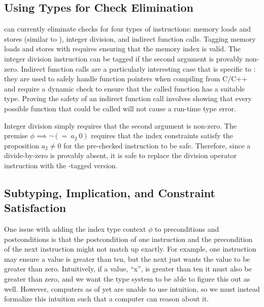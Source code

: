 \subsection{Using Types for Check Elimination}
\name can currently eliminate checks for four types of instructions: memory loads and stores (similar to \dtal), integer division, and indirect function calls.
Tagging memory loads and stores with \prechk requires ensuring that the memory index is valid.
The integer division instruction can be \prechk tagged if the second argument is provably non-zero.
Indirect function calls are a particularly interesting case that is specific to \wasm: they are used to safely handle function pointers when compiling from C/C++ and require a dynamic check to ensure that the called function has a suitable type.
Proving the safety of an indirect function call involves showing that every possible function that could be called will not cause a run-time type error.


Integer division simply requires that the second argument is non-zero.
The premise $\phi \implies \neg(=\ a_2\ 0)$ requires that the index constraints satisfy the proposition $a_2 \neq 0$ for the pre-checked instruction to be safe.
Therefore, since a divide-by-zero is provably absent, it is safe to replace the division operator instruction with the \prechk-tagged version.
\begin{mathpar}
\end{mathpar}

\subsection{Subtyping, Implication, and Constraint Satisfaction}
One issue with adding the index type context $\phi$ to preconditions and postconditions is that the postcondition of one instruction and the precondition of the next instruction might not match up exactly.
For example, one instruction may ensure a value is greater than ten, but the next just wants the value to be greater than zero.
Intuitively, if a value, ``x'', is greater than ten it must also be greater than zero, and we want the \name type system to be able to figure this out as well.
However, computers as of yet are unable to use intuition, so we must instead formalize this intuition such that a computer can reason about it.

